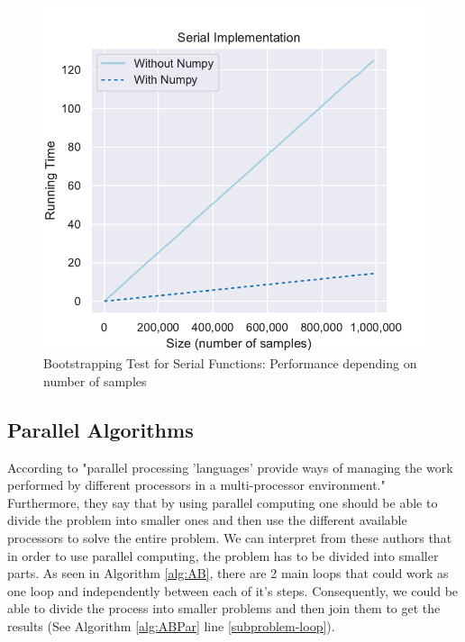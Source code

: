 \documentclass[11pt]{article}
\begin{document}
\begin{figure}[H]
    \begin{center}
        \includegraphics{serial_test.pdf}
    \end{center}
    \caption{Bootstrapping Test for Serial Functions: Performance depending on number of samples}\label{fig:SerialTest}
\end{figure}

\subsection{Parallel Algorithms}\label{subsec:parallel-algorithms}

According to \cite{STCR} "parallel processing 'languages' provide ways of managing the work performed by different
processors in a multi-processor environment." Furthermore, they say that by using parallel computing one should be able
to divide the problem into smaller ones and then use the different available processors to solve the entire problem. We
can interpret from these authors that in order to use parallel computing, the problem has to be divided into smaller parts.
As seen in Algorithm \ref{alg:AB}, there are 2 main loops that could work as one loop and independently between each of
it's steps. Consequently, we could be able to divide the process into smaller problems and then join them to get the
results (See Algorithm \ref{alg:ABPar} line \ref{subproblem-loop}).
\end{document}
